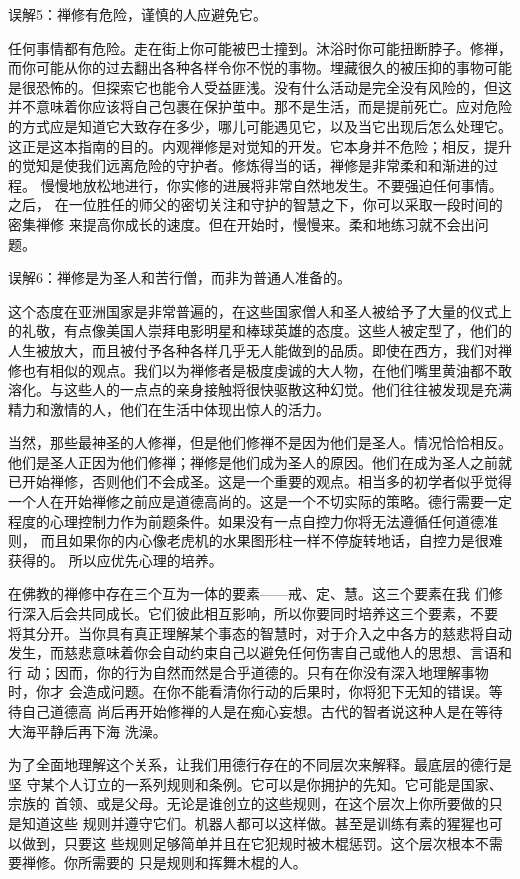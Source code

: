 \subsectnon 误解5：禅修有危险，谨慎的人应避免它。

任何事情都有危险。走在街上你可能被巴士撞到。沐浴时你可能扭断脖子。修禅，
而你可能从你的过去翻出各种各样令你不悦的事物。埋藏很久的被压抑的事物可能
是很恐怖的。但探索它也能令人受益匪浅。没有什么活动是完全没有风险的，但这
并不意味着你应该将自己包裹在保护茧中。那不是生活，而是提前死亡。应对危险
的方式应是知道它大致存在多少，哪儿可能遇见它，以及当它出现后\1怎么处理它。
这正是这本指南的目的。内观禅修是对觉知的开发。它本身并不危险；相反，提升
的觉知是使我们远离危险的守护者。修炼得当的话，禅修是非常柔和和渐进的过程。
慢慢地放松地进行，你实修的进展将非常自然地发生。不要强迫任何事情。之后，
在一位胜任的师父的密切关注和守护的智慧之下，你可以采取一段时间的密集禅修
来提高你成长的速度。但在开始时，慢慢来。柔和地练习就不会出问题。

\subsectnon 误解6：禅修是为圣人和苦行僧，而非为普通人准备的。

这个态度在亚洲国家是非常普遍的，在这些国家僧人和圣人被给予了大量的仪式上
的礼敬，有点像美国人崇拜电影明星和棒球英雄的态度。这些人被定型了，他们的
人生被放大，而且被付予各种各样几乎无人能做到的品质。即使在西方，我们对禅
修也有相似的观点。我们以为禅修者是极度虔诚的大人物，在他们嘴里黄油都不敢
溶化。与这些人的一点点的亲身接触将很快驱散这种幻觉。他们往往被发现是充满
精力和激情的人，他们在生活中体现出惊人的活力。

当然，那些最神圣的人修禅，但是他们修禅不是因为他们是圣人。情况恰恰相反。
他们是圣人正因为他们修禅；禅修是他们成为圣人的原因。他们在成为圣人之前就
已开始禅修，否则他们不会成圣。这是一个重要的观点。相当多的初学者似乎觉得
一个人\1在开始禅修之前应是道德高尚的。这是一个不切实际的策略。德行需要一定
程度的心理控制力作为前题条件。如果没有一点自控力你将无法遵循任何道德准则，
而且如果你的内心像老虎机的水果图形柱一样不停旋转地话，自控力是很难获得的。
所以应优先心理的培养。

在佛教的禅修中存在三个互为一体的要素——戒、定、慧。这三个要素在我
们修行深入后会共同成长。它们彼此相互影响，所以你要同时培养这三个要素，不要
将其分开。当你具有真正理解某个事态的智慧时，对于介入之中各方的慈悲将自动
发生，而慈悲意味着你会自动约束自己以避免任何伤害自己或他人的思想、言语和行
动；因而，你的行为自然而然是合乎道德的。只有在你没有深入地理解事物时，你才
会造成问题。在你不能看清你行动的后果时，你将犯下无知的错误。等待自己道德高
尚后再开始修禅的人是在痴心妄想。古代的智者说这种人是在等待大海平静后再下海
洗澡。

为了全面地理解这个关系，让我们用德行存在的不同层次来解释。最底层的德行是坚
守某个人订立的一系列规则和条例。它可以是你拥护的先知。它可能是国家、宗族的
首领、或是父母。无论是谁创立的这些规则，在这个层次上你所要做的只是知道这些
规则并遵守它们。机器人都可以这样做。甚至是训练有素的猩猩也可以做到，只要这
些规则足够简单并且在它犯规时被木棍惩罚。这个层次根本不需要禅修。你所需要的
只是规则和挥舞木棍的人。

